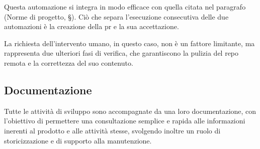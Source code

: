 \documentclass[10pt, a4paper]{article}
\begin{document}
Questa automazione si integra in modo efficace con quella citata nel paragrafo (Norme di progetto, \S {}).
Ciò che separa l'esecuzione consecutiva delle due automazioni è la creazione della pr e la sua accettazione.

La richiesta dell'intervento umano, in questo caso, non è un fattore limitante, ma rappresenta due ulteriori fasi di
verifica, che garantiscono la pulizia del repo remota e la correttezza del suo contenuto.

\subsection{Documentazione}
Tutte le attività di sviluppo sono accompagnate da una loro documentazione, con l'obiettivo di permettere una consultazione semplice e rapida alle informazioni inerenti al prodotto e alle attività stesse, svolgendo inoltre un ruolo di storicizzazione e di supporto alla manutenzione.
\end{document}
